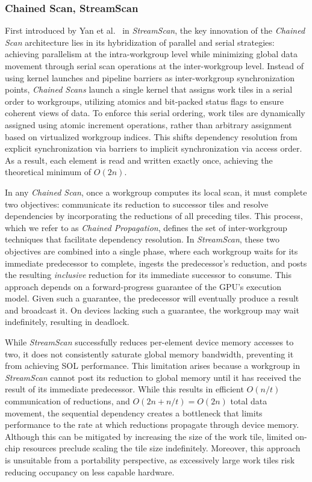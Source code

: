 \documentclass[acmsmall, manuscript, screen, review, anonymous]{acmart}
\begin{document}
\subsubsection{Chained Scan, StreamScan}
First introduced by Yan et al.~\cite{10.1145/2442516.2442539} in \emph{StreamScan}, the key innovation of the \emph{Chained Scan} architecture lies in its hybridization of parallel and serial strategies: achieving parallelism at the intra-workgroup level while minimizing global data movement through serial scan operations at the inter-workgroup level. Instead of using kernel launches and pipeline barriers as inter-workgroup synchronization points, \emph{Chained Scans} launch a single kernel that assigns work tiles in a serial order to workgroups, utilizing atomics and bit-packed status flags to ensure coherent views of data. To enforce this serial ordering, work tiles are dynamically assigned using atomic increment operations, rather than arbitrary assignment based on virtualized workgroup indices. This shifts dependency resolution from explicit synchronization via barriers to implicit synchronization via access order. As a result, each element is read and written exactly once, achieving the theoretical minimum of $O(2n)$.

In any \emph{Chained Scan}, once a workgroup computes its local scan, it must complete two objectives: communicate its reduction to successor tiles and resolve dependencies by incorporating the reductions of all preceding tiles. This process, which we refer to as \emph{Chained Propagation}, defines the set of inter-workgroup techniques that facilitate dependency resolution. In \emph{StreamScan}, these two objectives are combined into a single phase, where each workgroup waits for its immediate predecessor to complete, ingests the predecessor's reduction, and posts the resulting \emph{inclusive} reduction for its immediate successor to consume. This approach depends on a forward-progress guarantee of the GPU's execution model. Given such a guarantee, the predecessor will eventually produce a result and broadcast it. On devices lacking such a guarantee, the workgroup may wait indefinitely, resulting in deadlock.

While \emph{StreamScan} successfully reduces per-element device memory accesses to two, it does not consistently saturate global memory bandwidth, preventing it from achieving SOL performance. This limitation arises because a workgroup in \emph{StreamScan} cannot post its reduction to global memory until it has received the result of its immediate predecessor. While this results in efficient $O(n/t)$ communication of reductions, and $O(2n+ n/t)= O(2n)$ total data movement, the sequential dependency creates a bottleneck that limits performance to the rate at which reductions propagate through device memory. Although this can be mitigated by increasing the size of the work tile, limited on-chip resources preclude scaling the tile size indefinitely. Moreover, this approach is unsuitable from a portability perspective, as excessively large work tiles risk reducing occupancy on less capable hardware.
\end{document}
